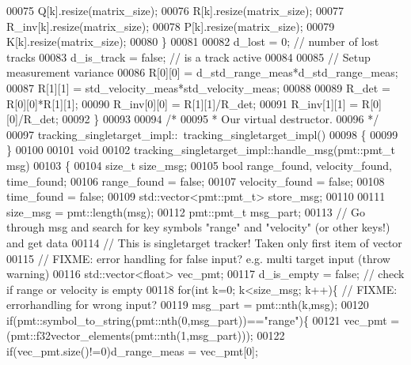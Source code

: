 \begin{DoxyCode}
00075             Q[k].resize(matrix\_size);
00076             R[k].resize(matrix\_size);
00077             R_inv[k].resize(matrix\_size);
00078             P[k].resize(matrix\_size);
00079             K[k].resize(matrix\_size);
00080         \}
00081         
00082         d_lost = 0; \textcolor{comment}{// number of lost tracks}
00083         d_is_track = \textcolor{keyword}{false}; \textcolor{comment}{// is a track active}
00084         
00085         \textcolor{comment}{// Setup measurement variance}
00086         R[0][0] = d_std_range_meas*d_std_range_meas;
00087         R[1][1] = std\_velocity\_meas*std\_velocity\_meas;
00088         
00089         R_det = R[0][0]*R[1][1];
00090         R_inv[0][0] = R[1][1]/R_det;
00091         R_inv[1][1] = R[0][0]/R_det;
00092     \}
00093 
00094     \textcolor{comment}{/*}
00095 \textcolor{comment}{     * Our virtual destructor.}
00096 \textcolor{comment}{     */}
00097     tracking_singletarget_impl::~tracking_singletarget_impl()
00098     \{
00099     \}
00100     
00101     \textcolor{keywordtype}{void}
00102     tracking_singletarget_impl::handle_msg(pmt::pmt\_t msg)
00103     \{   
00104         \textcolor{keywordtype}{size\_t} size\_msg;
00105         \textcolor{keywordtype}{bool} range\_found, velocity\_found, time\_found;
00106         range\_found = \textcolor{keyword}{false};
00107         velocity\_found = \textcolor{keyword}{false};
00108         time\_found = \textcolor{keyword}{false};
00109         std::vector<pmt::pmt\_t> store\_msg;
00110         
00111         size\_msg = pmt::length(msg);
00112         pmt::pmt\_t msg\_part;
00113         \textcolor{comment}{// Go through msg and search for key symbols "range" and "velocity" (or other keys!) and get data}
00114         \textcolor{comment}{// This is singletarget tracker! Taken only first item of vector}
00115         \textcolor{comment}{// FIXME: error handling for false input? e.g. multi target input (throw warning)}
00116         std::vector<float> vec\_pmt;
00117         d_is_empty = \textcolor{keyword}{false}; \textcolor{comment}{// check if range or velocity is empty}
00118         \textcolor{keywordflow}{for}(\textcolor{keywordtype}{int} k=0; k<size\_msg; k++)\{ \textcolor{comment}{// FIXME: errorhandling for wrong input?}
00119             msg\_part = pmt::nth(k,msg);
00120             \textcolor{keywordflow}{if}(pmt::symbol\_to\_string(pmt::nth(0,msg\_part))==\textcolor{stringliteral}{"range"})\{
00121                 vec\_pmt = (pmt::f32vector\_elements(pmt::nth(1,msg\_part)));
00122                 \textcolor{keywordflow}{if}(vec\_pmt.size()!=0)d_range_meas = vec\_pmt[0];

\end{DoxyCode}
